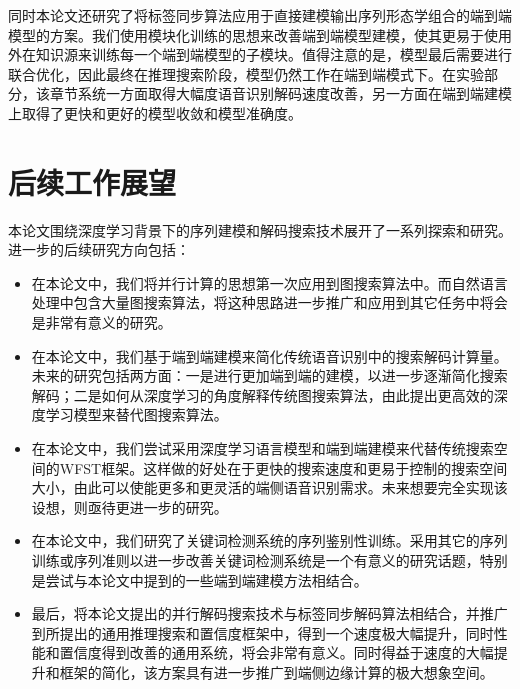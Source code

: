 同时本论文还研究了将标签同步算法应用于直接建模输出序列形态学组合的端到端模型的方案。我们使用模块化训练的思想来改善端到端模型建模，使其更易于使用外在知识源来训练每一个端到端模型的子模块。值得注意的是，模型最后需要进行联合优化，因此最终在推理搜索阶段，模型仍然工作在端到端模式下。在实验部分，该章节系统一方面取得大幅度语音识别解码速度改善，另一方面在端到端建模上取得了更快和更好的模型收敛和模型准确度。


\section{后续工作展望}
\label{chap:sum-future}

本论文围绕深度学习背景下的序列建模和解码搜索技术展开了一系列探索和研究。进一步的后续研究方向包括：
\begin{itemize}
	\item 在本论文中，我们将并行计算的思想第一次应用到图搜索算法中。而自然语言处理中包含大量图搜索算法，将这种思路进一步推广和应用到其它任务中将会是非常有意义的研究。
	\item 在本论文中，我们基于端到端建模来简化传统语音识别中的搜索解码计算量。未来的研究包括两方面：一是进行更加端到端的建模，以进一步逐渐简化搜索解码；二是如何从深度学习的角度解释传统图搜索算法，由此提出更高效的深度学习模型来替代图搜索算法。
	\item 在本论文中，我们尝试采用深度学习语言模型和端到端建模来代替传统搜索空间的WFST框架。这样做的好处在于更快的搜索速度和更易于控制的搜索空间大小，由此可以使能更多和更灵活的端侧语音识别需求。未来想要完全实现该设想，则亟待更进一步的研究。
	\item 在本论文中，我们研究了关键词检测系统的序列鉴别性训练。采用其它的序列训练或序列准则以进一步改善关键词检测系统是一个有意义的研究话题，特别是尝试与本论文中提到的一些端到端建模方法相结合。
	\item 最后，将本论文提出的并行解码搜索技术与标签同步解码算法相结合，并推广到所提出的通用推理搜索和置信度框架中，得到一个速度极大幅提升，同时性能和置信度得到改善的通用系统，将会非常有意义。同时得益于速度的大幅提升和框架的简化，该方案具有进一步推广到端侧边缘计算的极大想象空间。
\end{itemize}

